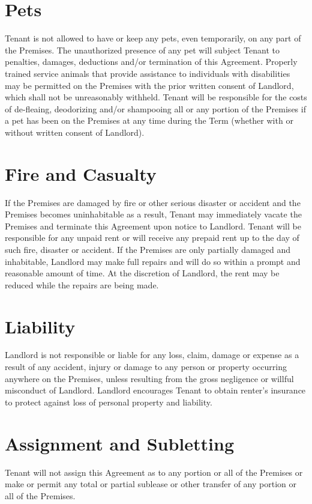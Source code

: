 \documentclass[12pt]{article}
\begin{document}
{\section{Pets}
Tenant is not allowed to have or keep any pets, even temporarily, on any part of the Premises.
The unauthorized presence of any pet will subject Tenant to penalties, damages, deductions
and/or termination of this Agreement. Properly trained service animals that provide assistance
to individuals with disabilities may be permitted on the Premises with the prior written
consent of Landlord, which shall not be unreasonably withheld. Tenant will be responsible for
the costs of de-fleaing, deodorizing and/or shampooing all or any portion of the Premises if a
pet has been on the Premises at any time during the Term (whether with or without written
consent of Landlord).

\section{Fire and Casualty}
If the Premises are damaged by fire or other serious disaster or accident and the Premises
becomes uninhabitable as a result, Tenant may immediately vacate the Premises and terminate
this Agreement upon notice to Landlord. Tenant will be responsible for any unpaid rent or will
receive any prepaid rent up to the day of such fire, disaster or accident. If the Premises are
only partially damaged and inhabitable, Landlord may make full repairs and will do so within a
prompt and reasonable amount of time. At the discretion of Landlord, the rent may be reduced
while the repairs are being made.

\section{Liability}
Landlord is not responsible or liable for any loss, claim, damage or expense as a result of
any accident, injury or damage to any person or property occurring anywhere on the Premises,
unless resulting from the gross negligence or willful misconduct of Landlord. Landlord encourages
Tenant to obtain renter's insurance to protect against loss of personal property and liability.

\section{Assignment and Subletting}
Tenant will not assign this Agreement as to any portion or all of the Premises or make or
permit any total or partial sublease or other transfer of any portion or all of the Premises.

}
\end{document}
